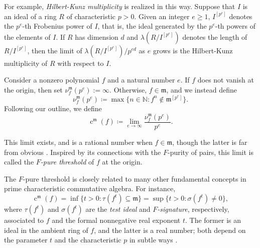 \documentclass{amsart}
\newcommand{\ft}{\operatorname{c}}
\newcommand{\idealm}{\mathfrak{m}}
\renewcommand{\geq}{\geqslant}
\begin{document}
For example, \emph{Hilbert-Kunz multiplicity} is realized in this way. 
Suppose that $I$ is an ideal of a ring $R$ of characteristic $p>0$.
Given an integer $e \geq 1$, 
$I^{[p^e]}$ denotes the $p^e$-th Frobenius power of $I$, that is, the ideal generated by the $p^e$-th powers of the elements of $I$. 
If $R$ has dimension $d$ and $\lambda\left(R/I^{[p^e]}\right)$ denotes the length of $R/I^{[p^e]}$, 
then the limit of $\lambda\left(R/I^{[p^e]}\right)/p^{ed}$ as $e$ grows is the Hilbert-Kunz multiplicity of $R$ with respect to $I$. 

Consider a nonzero polynomial $f$ and a natural number $e$.  If $f$ does not vanish at the origin, then set $\nu_f^{\idealm}(p^e) := \infty$.  Otherwise, $f \in \idealm$, and we instead define
\[ \nu_f^{\idealm}(p^e) \coloneqq  \max \{ n \in \mathbb{N} : f^n \notin \idealm^{[p^e]} \}. \]
Following our outline, we define
\[ \ft^{\idealm}(f) \coloneqq  \lim_{e \to \infty} \frac{ \nu_f^{\idealm}(p^e)}{p^e}. \]

This limit exists, and is a rational number when $f\in \idealm$, though the latter is far from obvious  \cite{BlickleMustataSmithDiscretenessAndRationalityOfFThresholds}.
Inspired by its connections with the $F$-purity of pairs,  this limit is called the \emph{$F$-pure threshold} of $f$ at the origin.

The $F$-pure threshold is closely related to many other fundamental concepts in prime characteristic commutative algebra.   For instance,
\[ \ft^{\idealm}(f) = \inf \{ t>0 : \tau(f^t)  \subseteq \idealm \} = \sup \{ t>0 : \sigma( f^t) \neq 0 \}, \]
where $\tau(f^t)$ and $\sigma(f^t)$ are the \emph{test ideal} and \emph{$F$-signature}, respectively, associated to $f$ and the formal nonnegative real exponent $t$.  The former is an ideal in the ambient ring of $f$, and the latter is a real number;  both depend on the parameter $t$ and the characteristic $p$ in subtle ways \cite{BlickleMustataSmithDiscretenessAndRationalityOfFThresholds, BlickleSchwedeTuckerFSigPairs1}.
\end{document}

